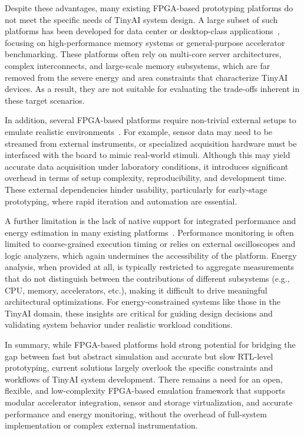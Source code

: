         Despite these advantages, many existing FPGA-based prototyping platforms do not meet the specific needs of TinyAI system design. A large subset of such platforms has been developed for data center or desktop-class applications~\cite{fame, extrapolator, ace}, focusing on high-performance memory systems or general-purpose accelerator benchmarking. These platforms often rely on multi-core server architectures, complex interconnects, and large-scale memory subsystems, which are far removed from the severe energy and area constraints that characterize TinyAI devices. As a result, they are not suitable for evaluating the trade-offs inherent in these target scenarios.
        
        In addition, several FPGA-based platforms require non-trivial external setups to emulate realistic environments~\cite{lime, daq}. For example, sensor data may need to be streamed from external instruments, or specialized acquisition hardware must be interfaced with the board to mimic real-world stimuli. Although this may yield accurate data acquisition under laboratory conditions, it introduces significant overhead in terms of setup complexity, reproducibility, and development time. These external dependencies hinder usability, particularly for early-stage prototyping, where rapid iteration and automation are essential.
        
        A further limitation is the lack of native support for integrated performance and energy estimation in many existing platforms~\cite{hybrid, hcl, plug}. Performance monitoring is often limited to coarse-grained execution timing or relies on external oscilloscopes and logic analyzers, which again undermines the accessibility of the platform. Energy analysis, when provided at all, is typically restricted to aggregate measurements that do not distinguish between the contributions of different subsystems (e.g., CPU, memory, accelerators, etc.), making it difficult to drive meaningful architectural optimizations. For energy-constrained systems like those in the TinyAI domain, these insights are critical for guiding design decisions and validating system behavior under realistic workload conditions.
        
        In summary, while FPGA-based platforms hold strong potential for bridging the gap between fast but abstract simulation and accurate but slow RTL-level prototyping, current solutions largely overlook the specific constraints and workflows of TinyAI system development. There remains a need for an open, flexible, and low-complexity FPGA-based emulation framework that supports modular accelerator integration, sensor and storage virtualization, and accurate performance and energy monitoring, without the overhead of full-system implementation or complex external instrumentation.

